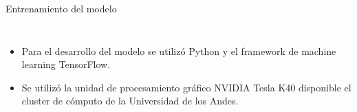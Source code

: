 \documentclass[12pt,aspectratio=169]{beamer}
\begin{document}
\begin{frame}{Entrenamiento del modelo}
    \begin{columns}[c] 
        
            \begin{itemize}
                \item Para el desarrollo del modelo se utilizó Python y el framework de machine learning TensorFlow.
                \vspace{8mm}
                \item Se utilizó la unidad de procesamiento gráfico NVIDIA Tesla K40 disponible el cluster de cómputo de la Universidad de los Andes.
            \end{itemize}
            
        

\end{columns}
\end{frame}
\end{document}
